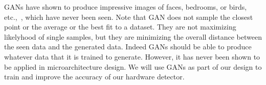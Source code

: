 


GANs have shown to produce impressive images of faces, bedrooms, or birds, etc.,~\cite{}, which have never been seen. Note that GAN does not sample the closest point or the average or the best fit to a dataset. They are not maximizing likelyhood of single samples, but they are minimizing the overall distance between the seen data and the generated data.  Indeed GANs should be able to produce whatever data that it is trained to generate. However, it has never been shown to be applied in microarchitecture design. We will use GANs as part of our design to train and improve the accuracy of our hardware detector.  



